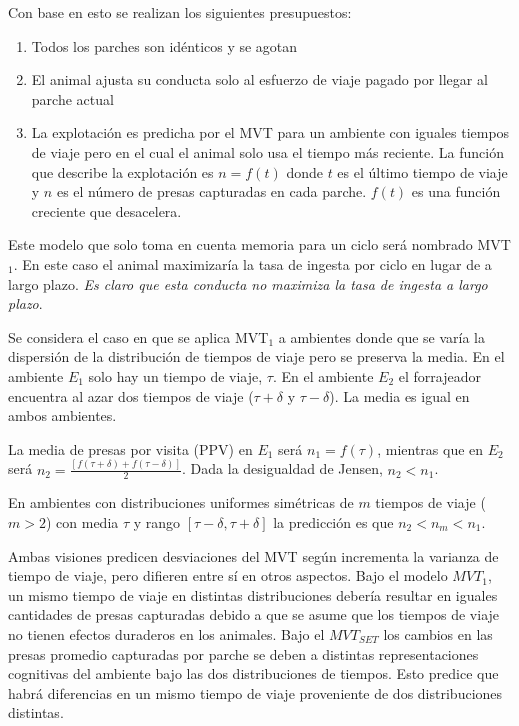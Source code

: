\documentclass[a4paper,12pt]{article}
\begin{document}
Con base en esto se realizan los siguientes presupuestos:

\begin{enumerate}
	\item Todos los parches son idénticos y se agotan
	\item El animal ajusta su conducta solo al esfuerzo de viaje pagado por llegar al parche actual
	\item La explotación es predicha por el MVT para un ambiente con iguales tiempos de viaje pero en el cual el animal solo usa el tiempo más reciente. La función que describe la explotación es $n = f(t)$ donde $t$ es el último tiempo de viaje y $n$ es el número de presas capturadas en cada parche. $f(t)$ es una función creciente que desacelera.
\end{enumerate}

Este modelo que solo toma en cuenta memoria para un ciclo será nombrado MVT$_{1}$. En este caso el animal maximizaría la tasa de ingesta por ciclo en lugar de a largo plazo. {\itshape Es claro que esta conducta no maximiza la tasa de ingesta a largo plazo}.

Se considera el caso en que se aplica MVT$_{1}$ a ambientes donde que se varía la dispersión de la distribución de tiempos de viaje pero se preserva la media. En el ambiente $E_{1}$ solo hay un tiempo de viaje, $\tau$. En el ambiente $E_{2}$ el forrajeador encuentra al azar dos tiempos de viaje ($\tau + \delta$ y $\tau - \delta$). La media es igual en ambos ambientes.

La media de presas por visita (PPV) en $E_{1}$ será $n_{1} = f(\tau)$, mientras que en $E_{2}$ será $n_{2} = \frac{[f(\tau + \delta) + f(\tau - \delta)]}{2}$. Dada la desigualdad de Jensen, $n_{2} < n_{1}$.

En ambientes con distribuciones uniformes simétricas de $m$ tiempos de viaje ($m > 2$) con media $\tau$ y rango $[\tau - \delta, \tau + \delta]$ la predicción es que $n_{2} < n_{m} < n_{1}$.

Ambas visiones predicen desviaciones del MVT según incrementa la varianza de tiempo de viaje, pero difieren entre sí en otros aspectos. Bajo el modelo $MVT_{1}$, un mismo tiempo de viaje en distintas distribuciones debería resultar en iguales cantidades de presas capturadas debido a que se asume que los tiempos de viaje no tienen efectos duraderos en los animales. Bajo el $MVT_{SET}$ los cambios en las presas promedio capturadas por parche se deben a distintas representaciones cognitivas del ambiente bajo las dos distribuciones de tiempos. Esto predice que habrá diferencias en un mismo tiempo de viaje proveniente de dos distribuciones distintas.
\end{document}
